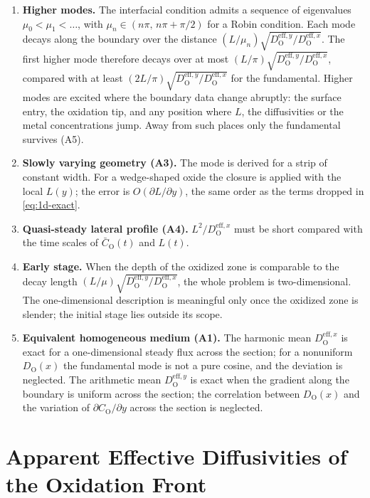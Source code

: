 \documentclass[12pt]{article}
\newcommand{\eff}{\mathrm{eff}}
\newcommand{\Ox}{\mathrm{O}}
\newcommand{\Dx}{D_{\Ox}^{\eff,x}}
\newcommand{\Dy}{D_{\Ox}^{\eff,y}}
\newcommand{\Cb}{\bar{C}_{\Ox}}
\begin{document}
\begin{enumerate}
  \item \textbf{Higher modes.} The interfacial condition admits a sequence of
        eigenvalues \(\mu_0<\mu_1<\dots\), with
        \(\mu_n\in(n\pi,\,n\pi+\pi/2)\) for a Robin condition. Each mode
        decays along the boundary over the distance
        \((L/\mu_n)\sqrt{\Dy/\Dx}\). The first higher mode therefore decays
        over at most \((L/\pi)\sqrt{\Dy/\Dx}\), compared with at least
        \((2L/\pi)\sqrt{\Dy/\Dx}\) for the fundamental. Higher modes are
        excited where the boundary data change abruptly: the surface entry,
        the oxidation tip, and any position where \(L\), the diffusivities or
        the metal concentrations jump. Away from such places only the
        fundamental survives (A5).
  \item \textbf{Slowly varying geometry (A3).} The mode is derived for a
        strip of constant width. For a wedge-shaped oxide the closure is
        applied with the local \(L(y)\); the error is
        \(O(\partial L/\partial y)\), the same order as the terms dropped in
        \eqref{eq:1d-exact}.
  \item \textbf{Quasi-steady lateral profile (A4).} \(L^2/\Dx\) must be short
        compared with the time scales of \(\Cb(t)\) and \(L(t)\).
  \item \textbf{Early stage.} When the depth of the oxidized zone is
        comparable to the decay length \((L/\mu)\sqrt{\Dy/\Dx}\), the whole
        problem is two-dimensional. The one-dimensional description is
        meaningful only once the oxidized zone is slender; the initial stage
        lies outside its scope.
  \item \textbf{Equivalent homogeneous medium (A1).} The harmonic mean
        \(\Dx\) is exact for a one-dimensional steady flux across the
        section; for a nonuniform \(D_{\Ox}(x)\) the fundamental mode is not
        a pure cosine, and the deviation is neglected. The arithmetic mean
        \(\Dy\) is exact when the gradient along the boundary is uniform
        across the section; the correlation between \(D_{\Ox}(x)\) and the
        variation of \(\partial C_{\Ox}/\partial y\) across the section is
        neglected.
\end{enumerate}

\section{Apparent Effective Diffusivities of the Oxidation Front}
\label{sec:si-deff}
\end{document}
